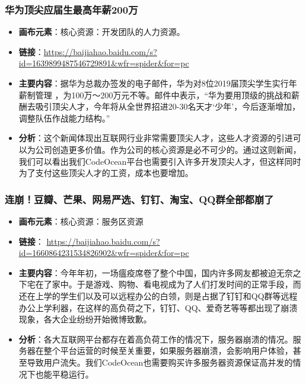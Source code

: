 \documentclass[a4paper]{ctexart}
\begin{document}
\subsubsection{华为顶尖应届生最高年薪200万}
\begin{itemize}
  \item \textbf{画布元素}：核心资源：开发团队的人力资源。
  \item \textbf{链接}：\url{https://baijiahao.baidu.com/s?id=1639899487546729891&wfr=spider&for=pc}
  \item \textbf{主要内容}：据华为总裁办签发的电子邮件，华为对8位2019届顶尖学生实行年薪制管理 ，为100万～200万元不等。邮件中表示，“华为要用顶级的挑战和薪酬去吸引顶尖人才，今年将从全世界招进20-30名天才‘少年’，今后逐渐增加，调整队伍作战能力结构。”
  \item \textbf{分析}：这个新闻体现出互联网行业非常需要顶尖人才，这些人才资源的引进可以为公司创造更多价值。作为公司的核心资源是必不可少的。通过这则新闻，我们可以看出我们CodeOcean平台也需要引入许多开发顶尖人才，但这样同时为了支付这些顶尖人才的工资，成本也要增加。
\end{itemize}

\subsubsection{连崩！豆瓣、芒果、网易严选、钉钉、淘宝、QQ群全部都崩了}
\begin{itemize}
  \item \textbf{画布元素}：核心资源：服务区资源
  \item \textbf{链接}： \url{https://baijiahao.baidu.com/s?id=1660864231534826902&wfr=spider&for=pc}
  \item \textbf{主要内容}：今年年初，一场瘟疫席卷了整个中国，国内许多网友都被迫无奈之下宅在了家中。于是游戏、购物、看电视成为了人们打发时间的正常手段，而还在上学的学生们以及可以远程办公的白领，则是占据了钉钉和QQ群等远程办公上学利器，在这样的高负荷之下，钉钉、QQ、爱奇艺等等都出现了崩溃现象，各大企业纷纷开始微博致歉。
  \item \textbf{分析}：各大互联网平台都存在着高负荷工作的情况下，服务器崩溃的情况。服务器在整个平台运营的时候至关重要，如果服务器崩溃，会影响用户体验，甚至导致用户流失。我们CodeOcean也需要购买许多服务器资源保证高并发的情况下也能平稳运行。
\end{itemize}
\end{document}
